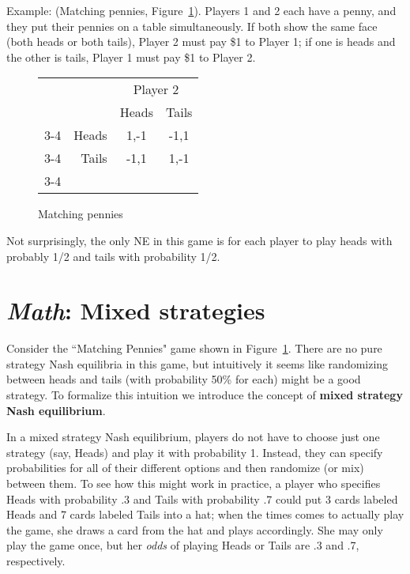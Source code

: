 Example: (Matching pennies, Figure~\ref{game_pennies}). Players 1 and 2 each have a penny, and they put their pennies on a table simultaneously. If both show the same face (both heads or both tails), Player 2 must pay \$1 to Player 1; if one is heads and the other is tails, Player 1 must pay \$1 to Player 2.

\begin{figure}[b]
\begin{center}
\begin{tabular}{crcc}
& & \multicolumn{2}{c}{Player 2} \\ [.15cm]
& & Heads & Tails \\ \cline{3-4}
\multirow{2}{1.5cm}{Player 1} & Heads & \multicolumn{1}{|c|}{1,-1} & \multicolumn{1}{c|}{-1,1} \\ \cline{3-4}
                   & Tails & \multicolumn{1}{|c|}{-1,1} & \multicolumn{1}{c|}{1,-1} \\ \cline{3-4}
\end{tabular}
\end{center}
\caption{Matching pennies}
\label{game_pennies} %
\end{figure}



Not surprisingly, the only NE in this game is for each player to play heads with probably 1/2 and tails with probability 1/2. %




\section{\emph{Math}: Mixed strategies}

Consider the ``Matching Pennies" game shown in Figure~\ref{game_pennies}. There are no pure strategy Nash equilibria in this game, but intuitively it seems like randomizing between heads and tails (with probability 50\% for each) might be a good strategy. To formalize this intuition we introduce the concept of \textbf{mixed strategy Nash equilibrium}.

In a mixed strategy Nash equilibrium, players do not have to choose just one strategy (say, Heads) and play it with probability 1. Instead, they can specify probabilities for all of their different options and then randomize (or mix) between them. To see how this might work in practice, a player who specifies Heads with probability .3 and Tails with probability .7 could put 3 cards labeled Heads and 7 cards labeled Tails into a hat; when the times comes to actually play the game, she draws a card from the hat and plays accordingly. She may only play the game once, but her \emph{odds} of playing Heads or Tails are .3 and .7, respectively.

